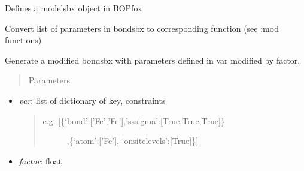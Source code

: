 \documentclass[letterpaper,10pt,english]{sphinxmanual}
\begin{document}

\begin{fulllineitems}
\label{classes:bopmodel.modelsbx}
Defines a modelsbx object in BOPfox

\begin{fulllineitems}
\label{classes:bopmodel.modelsbx.bond_parameters_to_functions}
Convert list of parameters in bondsbx to corresponding function 
(see :mod functions)

\end{fulllineitems}


\begin{fulllineitems}
\label{classes:bopmodel.modelsbx.rattle}
Generate a modified bondsbx with parameters defined in var modified 
by factor.
\begin{quote}\begin{description}
\item[{Parameters}] \leavevmode
\end{description}\end{quote}
\begin{itemize}
\item {} 
\emph{var}: list of dictionary of key, constraints
\begin{quote}
\begin{description}
\item[{e.g. {[}\{`bond':{[}'Fe','Fe'{]},'sssigma':{[}True,True,True{]}\}}] \leavevmode
,\{`atom':{[}'Fe'{]}, `onsitelevels':{[}True{]}\}{]}

\end{description}
\end{quote}

\item {} 
\emph{factor}: float

\end{itemize}

\end{fulllineitems}


\end{fulllineitems}
\end{document}
